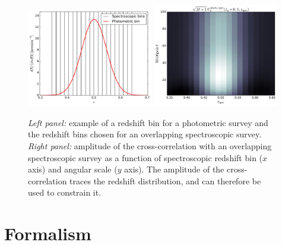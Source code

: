 \documentclass[prd,twocolumn]{revtex4}
\begin{document}
    \begin{figure}
      \centering
      \includegraphics[width=0.49\textwidth]{bins}
      \includegraphics[width=0.49\textwidth]{xcorr_map}
      \caption{{\sl Left panel:} example of a redshift bin for a photometric survey and the redshift
               bins chosen for an overlapping spectroscopic survey.
               {\sl Right panel:} amplitude of the cross-correlation with an overlapping spectroscopic
               survey as a function of spectroscopic redshift bin ($x$ axis) and angular scale
               ($y$ axis). The amplitude of the cross-correlation traces the redshift distribution,
               and can therefore be used to constrain it.}
      \label{fig:clustred_example}
    \end{figure}
\section{Formalism}\label{sec:method}
\end{document}
